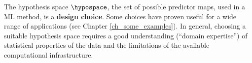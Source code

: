 \documentclass[12pt]{report}
\begin{document}
The hypothesis space $\hypospace$, the set of possible predictor maps, 
used in a ML method, is a {\bf design choice}. Some choices have 
proven useful for a wide range of applications (see Chapter \ref{ch_some_examples}). 
In general, choosing a suitable hypothesis space requires a good 
understanding (``domain expertise'') of statistical properties of 
the data and the limitations of the available computational infrastructure. 







\end{document}

